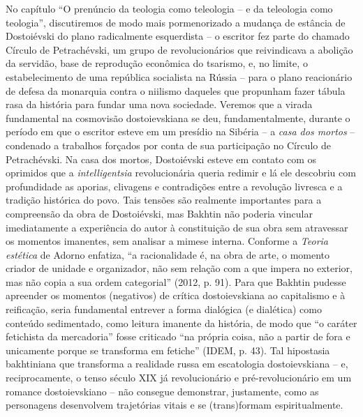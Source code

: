 No capítulo ``O prenúncio da teologia como teleologia -- e da teleologia
como teologia'', discutiremos de modo mais pormenorizado a mudança de
estância de Dostoiévski do plano radicalmente esquerdista -- o escritor
fez parte do chamado Círculo de Petrachévski, um grupo de
revolucionários que reivindicava a abolição da servidão, base de
reprodução econômica do tsarismo, e, no limite, o estabelecimento de uma
república socialista na Rússia -- para o plano reacionário de defesa da
monarquia contra o niilismo daqueles que propunham fazer tábula rasa da
história para fundar uma nova sociedade. Veremos que a virada
fundamental na cosmovisão dostoievskiana se deu, fundamentalmente,
durante o período em que o escritor esteve em um presídio na Sibéria --
a \emph{casa dos mortos} -- condenado a trabalhos forçados por conta de
sua participação no Círculo de Petrachévski. Na casa dos mortos\emph{,}
Dostoiévski esteve em contato com os oprimidos que a
\emph{intelligentsia} revolucionária queria redimir e lá ele descobriu
com profundidade as aporias, clivagens e contradições entre a revolução
livresca e a tradição histórica do povo. Tais tensões são realmente
importantes para a compreensão da obra de Dostoiévski, mas Bakhtin não
poderia vincular imediatamente a experiência do autor à constituição de
sua obra sem atravessar os momentos imanentes, sem analisar a mimese
interna. Conforme a \emph{Teoria estética} de Adorno enfatiza, ``a
racionalidade é, na obra de arte, o momento criador de unidade e
organizador, não sem relação com a que impera no exterior, mas não copia
a sua ordem categorial'' (2012, p. 91). Para que Bakhtin pudesse
apreender os momentos (negativos) de crítica dostoievskiana ao
capitalismo e à reificação, seria fundamental entrever a forma dialógica
(e dialética) como conteúdo sedimentado, como leitura imanente da
história, de modo que ``o caráter fetichista da mercadoria'' fosse
criticado ``na própria coisa, não a partir de fora e unicamente porque
se transforma em fetiche'' (IDEM, p. 43). Tal hipostasia bakhtiniana que
transforma a realidade russa em escatologia dostoievskiana -- e,
reciprocamente, o tenso século XIX já revolucionário e
pré-revolucionário em um romance dostoievskiano -- não consegue
demonstrar, justamente, como as personagens desenvolvem trajetórias
vitais e se (trans)formam espiritualmente.

